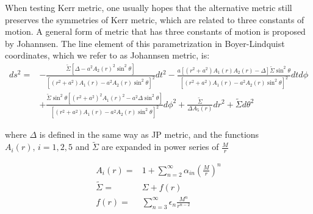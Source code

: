 \documentclass{article}
\begin{document}
When testing Kerr metric, one usually hopes that the alternative metric still preserves the symmetries of Kerr metric, which are related to three constants of motion. A general form of metric that has three constants of motion is proposed by Johannsen\cite{johannsen_final}. The line element of this parametrization in Boyer-Lindquist coordinates, which we refer to as Johannsen metric, is:
\begin{equation}
\begin{aligned}
	ds^2 =& -\frac{\tilde{\Sigma} [\Delta - a^2 A_2(r)^2 \sin^2\theta ] }{ [ (r^2+a^2)A_1(r) - a^2 A_2(r) \sin^2\theta ]^2 } dt^2 -  \frac{a [(r^2 + a^2 )A_1(r)A_2(r) - \Delta ] \tilde{\Sigma} \sin^2\theta }{ [(r^2+a^2 ) A_1(r) -a^2 A_2(r) \sin^2 \theta ]^2 } dtd\phi\\
	& + \frac{\tilde{\Sigma} \sin^2\theta [(r^2+a^2)^2 A_1(r)^2 - a^2\Delta \sin^2\theta  ]}{ [(r^2+a^2)A_1(r) - a^2 A_2(r) \sin^2 \theta ]^2 } d\phi^2 +\frac{\tilde{\Sigma}}{\Delta A_5(r)} dr^2  + \tilde{\Sigma} d\theta^2
\end{aligned}
\end{equation}

where $\Delta$ is defined in the same way as JP metric, and the functions $A_i(r),\,i=1,2,5$ and $\tilde{\Sigma}$ are expanded in power series of $\frac{M}{r}$

\begin{equation}
\begin{aligned}
	A_i(r) =& 1+ \sum_{n=2}^{\infty} \alpha_{in} (\frac M r)^n\\
	\tilde{\Sigma} =& \Sigma +f(r)\\
	f(r)=&\sum_{n=3}^{\infty} \epsilon_n \frac{M^n}{r^{n-2}}
\end{aligned}
\end{equation}
\end{document}
